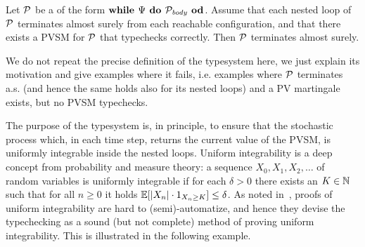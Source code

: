\begin{theorem}
\label{thm:holger-comp}
Let $\mathcal{P}$ be a \PP{} of the form $\textbf{while } \Psi \textbf{ do } 
\mathcal{P}_{\mathit{body}} \textbf{ od}$. Assume that each nested loop of $\mathcal{P}$ terminates almost surely from each reachable configuration, and that there exists a PVSM for $\mathcal{P}$ that typechecks correctly. Then $\mathcal{P}$ terminates almost surely.
\end{theorem}

We do not repeat the precise definition of the typesystem here, we just explain its motivation and give examples where it fails, i.e. examples where $\mathcal{P}$ terminates a.s. (and hence the same holds also for its nested loops) and a PV martingale exists, but no PVSM typechecks.  

The purpose of the typesystem is, in principle, to ensure that the stochastic 
process which, in each time step, returns the current value of the PVSM, is 
uniformly integrable inside the nested loops. Uniform integrability is a deep 
concept from probability and measure theory: a sequence $X_0,X_1,X_2,\dots$ of 
random variables is uniformly integrable if for each $\delta>0$ there exists an 
$K\in \mathbb{N}$ such that for all $n\geq 0$ it holds $\mathbb{E}[|X_n|\cdot{1}_{X_n 
\geq K}]\leq \delta$. As noted in~\cite{HolgerPOPL}, proofs of uniform 
integrability are hard to (semi)-automatize, and hence they devise the 
typechecking as a sound (but not complete) method of proving uniform 
integrability. This is illustrated in the following example.

